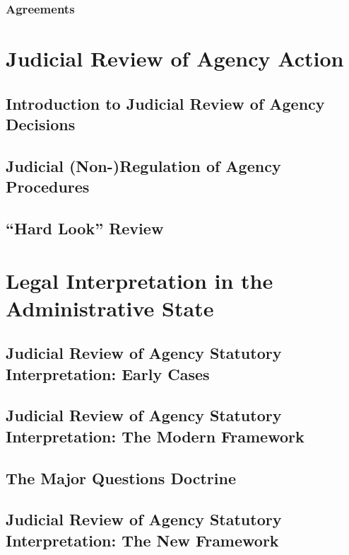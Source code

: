 \documentclass[11pt]{tex/lawoutline}
\begin{document}
\subsection{Agreements}

\chapter{Judicial Review of Agency Action}

\section{Introduction to Judicial Review of Agency Decisions}

\section{Judicial (Non-)Regulation of Agency Procedures}

\section{“Hard Look” Review}

\chapter{Legal Interpretation in the Administrative State}

\section{Judicial Review of Agency Statutory Interpretation: Early Cases} 

\section{Judicial Review of Agency Statutory Interpretation: The Modern Framework}

\section{The Major Questions Doctrine}

\section{Judicial Review of Agency Statutory Interpretation: The New Framework}
\end{document}
